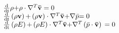 \documentclass{minimal}
\begin{document}
 \begin{align*}
\begin{array}{l} 
  {\textstyle{{\rm{d}} \over {{\rm{dt}}}}}\rho {\rm{  +  }}\rho  \cdot \nabla _{}^T{\mathbf{\bar v}}{\rm{ }} = {\rm{ }}0\\ 
  {\textstyle{{\rm{d}} \over {{\rm{dt}}}}}\left( {\rho {\mathbf{v}}} \right){\rm{  +  }}\left( {\rho {\mathbf{v}}} \right) \cdot \nabla _{}^T{\mathbf{\bar v}}{\rm{  +  }}\nabla \bar p{\rm{  =  0}}\\ 
  {\textstyle{{\rm{d}} \over {{\rm{dt}}}}}\left( {\rho E} \right){\rm{  +  }}\left( {\rho E} \right) \cdot \nabla _{}^T{\mathbf{\bar v}}{\rm{  +  }}\nabla _{}^T\left( {\bar p \cdot {\mathbf{\bar v}}} \right){\rm{ }} = {\rm{ }}0 
  \end{array}
 \end{align*}
 
\end{document}
